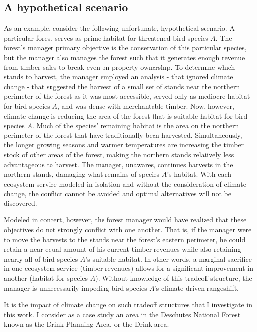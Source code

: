 \subsection{A hypothetical scenario}
As an example, consider the following unfortunate, hypothetical scenario. A particular forest serves as prime habitat for threatened bird species $A$. The forest's manager primary objective is the conservation of this particular species, but the manager also manages the forest such that it generates enough revenue from timber sales to break even on property ownership.  To determine which stands to harvest, the manager employed an analysis - that ignored climate change - that suggested the harvest of a small set of stands near the northern perimeter of the forest as it was most accessible, served only as mediocre habitat for bird species $A$, and was dense with merchantable timber. Now, however, climate change is reducing the area of the forest that is suitable habitat for bird species $A$. Much of the species' remaining habitat is the area on the northern perimeter of the forest that have traditionally been harvested. Simultaneously, the longer growing seasons and warmer temperatures are increasing the timber stock of other areas of the forest, making the northern stands relatively less advantageous to harvest. The manager, unawares, continues harvests in the northern stands, damaging what remains of species $A$'s habitat. With each ecosystem service modeled in isolation and without the consideration of climate change, the conflict cannot be avoided and optimal alternatives will not be discovered.

Modeled in concert, however, the forest manager would have realized that these objectives do not strongly conflict with one another. That is, if the manager were to move the harvests to the stands near the forest's eastern perimeter, he could retain a near-equal amount of his current timber revenues while also retaining nearly all of bird species $A$'s suitable habitat. In other words, a marginal sacrifice in one ecosystem service (timber revenues) allows for a significant improvement in another (habitat for species $A$). Without knowledge of this tradeoff structure, the manager is unnecessarily impeding bird species $A$'s climate-driven rangeshift.

It is the impact of climate change on such tradeoff structures that I investigate in this work. I consider as a case study an area in the Deschutes National Forest known as the Drink Planning Area, or the Drink area.